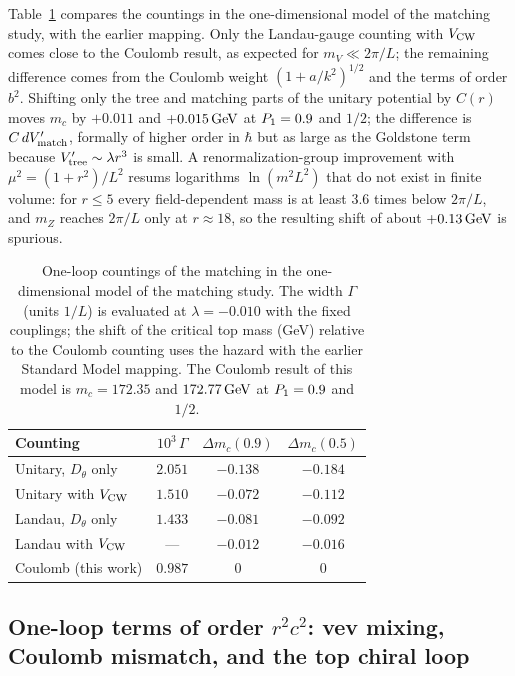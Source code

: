 Table~\ref{tab:rb-countings} compares the countings in the one-dimensional model of the matching study, with the earlier mapping. %
Only the Landau-gauge counting with $V_{\rm CW}$ comes close to the Coulomb result, as expected for $m_V\ll2\pi/L$; the remaining difference comes from the Coulomb weight $(1+a/k^2)^{1/2}$ and the terms of order $b^2$.
Shifting only the tree and matching parts of the unitary potential by $C(r)$ moves $m_c$ by $+0.011$ and $+0.015\,\mathrm{GeV}$ at $P_1=0.9$ and $1/2$; the difference is $C\,dV'_{\rm match}$, formally of higher order in $\hbar$ but as large as the Goldstone term because $V'_{\rm tree}\sim\lambda r^3$ is small. %
A renormalization-group improvement with $\mu^2=(1+r^2)/L^2$ resums logarithms $\ln(m^2L^2)$ that do not exist in finite volume: for $r\le5$ every field-dependent mass is at least $3.6$ times below $2\pi/L$, and $m_Z$ reaches $2\pi/L$ only at $r\approx18$, so the resulting shift of about $+0.13\,\mathrm{GeV}$ is spurious. %

\begin{table}[t]
\centering
\caption{One-loop countings of the matching in the one-dimensional model of the matching study.
The width $\Gamma$ (units $1/L$) is evaluated at $\lambda=-0.010$ with the fixed couplings; the shift of the critical top mass (GeV) relative to the Coulomb counting uses the hazard with the earlier Standard Model mapping. %
The Coulomb result of this model is $m_c=172.35$ and $172.77\,\mathrm{GeV}$ at $P_1=0.9$ and $1/2$.} %
\label{tab:rb-countings}
\begin{tabular}{lccc}
\toprule
Counting & $10^3\,\Gamma$ & $\Delta m_c(0.9)$ & $\Delta m_c(0.5)$ \\
\midrule
Unitary, $D_\theta$ only & $2.051$ & $-0.138$ & $-0.184$ \\ %
Unitary with $V_{\rm CW}$ & $1.510$ & $-0.072$ & $-0.112$ \\ %
Landau, $D_\theta$ only & $1.433$ & $-0.081$ & $-0.092$ \\ %
Landau with $V_{\rm CW}$ & --- & $-0.012$ & $-0.016$ \\ %
Coulomb (this work) & $0.987$ & $0$ & $0$ \\ %
\bottomrule
\end{tabular}
\end{table}

\subsection{One-loop terms of order \texorpdfstring{$r^2c^2$}{r2c2}: vev mixing, Coulomb mismatch, and the top chiral loop}
\label{sec:rb-r2c2}

